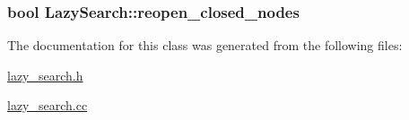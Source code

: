 \hypertarget{classLazySearch_a5d08aa7f2a8eb170ab0e32b006265218}{
\subsubsection[{reopen\-\_\-closed\-\_\-nodes}]{\setlength{\rightskip}{0pt plus 5cm}bool Lazy\-Search\-::reopen\-\_\-closed\-\_\-nodes\hspace{0.3cm}{\ttfamily [protected]}}}\label{classLazySearch_a5d08aa7f2a8eb170ab0e32b006265218}


The documentation for this class was generated from the following files\-:\begin{DoxyCompactItemize}
\item 
\hyperlink{lazy__search_8h}{lazy\-\_\-search.\-h}\item 
\hyperlink{lazy__search_8cc}{lazy\-\_\-search.\-cc}\end{DoxyCompactItemize}
